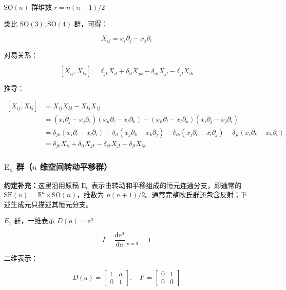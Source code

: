 $\mathrm{SO}\left(n\right)$ 群维数 $r=n\left(n-1\right)/2$

类比 $\mathrm{SO}\left(3\right),\mathrm{SO}\left(4\right)$ 群，可得：

\begin{equation}
X_{ij}
=x_i\partial_j-x_j\partial_i
\end{equation}

对易关系：

\begin{equation}
\left[X_{ij} , X_{kl} \right]
=\delta_{jk}X_{il} + \delta_{il}X_{jk} - \delta_{ik}X_{jl} - \delta_{jl}X_{ik}
\end{equation}

推导：

\begin{align}
\left[X_{ij} , X_{kl} \right]
&=X_{ij}X_{kl} - X_{kl}X_{ij} \\
&=\left(x_i\partial_j-x_j\partial_i \right)\left(x_k\partial_l-x_l\partial_k \right) - \left(x_k\partial_l-x_l\partial_k \right)\left(x_i\partial_j-x_j\partial_i \right) \\
&=\delta_{jk}\left(x_i\partial_l-x_l\partial_i \right) + \delta_{il}\left(x_j\partial_k-x_k\partial_j \right) -\delta_{ik}\left(x_j\partial_l-x_l\partial_j \right) - \delta_{jl}\left(x_i\partial_k-x_k\partial_i \right) \\
&=\delta_{jk}X_{il} + \delta_{il}X_{jk} - \delta_{ik}X_{jl} - \delta_{jl}X_{ik}
\end{align}

\subsubsection*{\texorpdfstring{$\mathrm{E}_n$ 群（$n$ 维空间转动平移群）}{En 群（n 维空间转动平移群）}}

\textbf{约定补充：}这里沿用原稿 $\mathrm{E}_n$ 表示由转动和平移组成的恒元连通分支，即通常的 $\mathrm{SE}\left(n\right)=\mathbb{R}^n\rtimes\mathrm{SO}\left(n\right)$，维数为 $n\left(n+1\right)/2$。通常完整欧氏群还包含反射；下述生成元只描述其恒元分支。

$E_1$ 群，一维表示 $D\left(a\right)=\mathrm{e}^a$

\begin{equation}
I
=\frac{\mathrm{d}\mathrm{e}^a }{\mathrm{d} a }\bigg|_{a=0} 
=1
\end{equation}

二维表示：

\begin{equation}
D\left(a\right)=\begin{bmatrix}
1 &a \\
0 &1
\end{bmatrix},\quad
I'=\begin{bmatrix}
0 &1 \\
0 &0
\end{bmatrix}
\end{equation}

